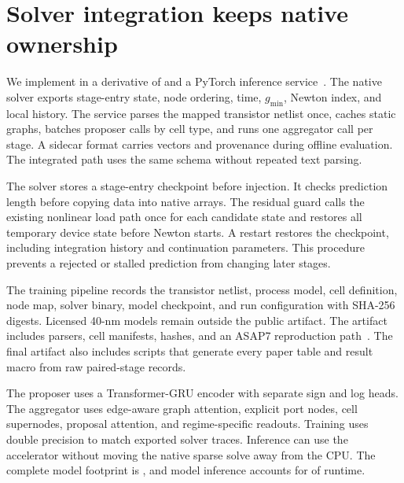 \section{Solver integration keeps native ownership}
\label{sec:implementation}

We implement \system{} in a derivative of \ngspice{} and a PyTorch inference service~\cite{quarles1993spice3,paszke2019pytorch}. The native solver exports stage-entry state, node ordering, time, $g_{\min}$, Newton index, and local history. The service parses the mapped transistor netlist once, caches static graphs, batches proposer calls by cell type, and runs one aggregator call per stage. A sidecar format carries vectors and provenance during offline evaluation. The integrated path uses the same schema without repeated text parsing.

The solver stores a stage-entry checkpoint before injection. It checks prediction length before copying data into native arrays. The residual guard calls the existing nonlinear load path once for each candidate state and restores all temporary device state before Newton starts. A restart restores the checkpoint, including integration history and continuation parameters. This procedure prevents a rejected or stalled prediction from changing later stages.

The training pipeline records the transistor netlist, process model, cell definition, node map, solver binary, model checkpoint, and run configuration with SHA-256 digests. Licensed 40-nm models remain outside the public artifact. The artifact includes parsers, cell manifests, hashes, and an ASAP7 reproduction path~\cite{clark2016asap7}. The final artifact also includes scripts that generate every paper table and result macro from raw paired-stage records.

The proposer uses a Transformer-GRU encoder with separate sign and log heads. The aggregator uses edge-aware graph attention, explicit port nodes, cell supernodes, proposal attention, and regime-specific readouts. Training uses double precision to match exported solver traces. Inference can use the accelerator without moving the native sparse solve away from the CPU. The complete model footprint is \ModelMemory{}, and model inference accounts for \InferenceShare{} of \system{} runtime.

